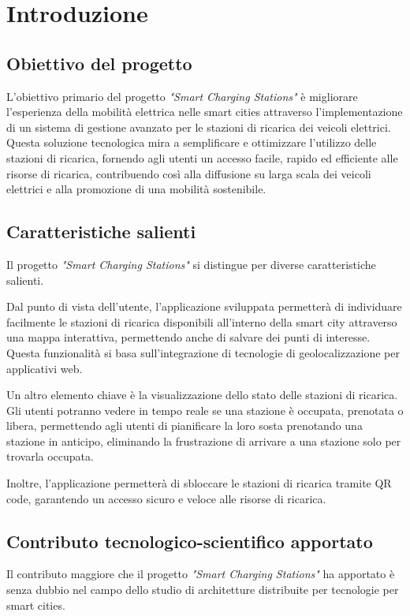 

\section{Introduzione}

\subsection{Obiettivo del progetto}
L'obiettivo primario del progetto \textit{"Smart Charging Stations"} è migliorare l'esperienza della
mobilità elettrica nelle smart cities attraverso l'implementazione di un sistema di gestione avanzato
per le stazioni di ricarica dei veicoli elettrici. Questa soluzione tecnologica mira a semplificare e
ottimizzare l'utilizzo delle stazioni di ricarica, fornendo agli utenti un accesso facile, rapido ed
efficiente alle risorse di ricarica, contribuendo così alla diffusione su larga scala dei veicoli elettrici
e alla promozione di una mobilità sostenibile.

\subsection{Caratteristiche salienti}
Il progetto \textit{"Smart Charging Stations"} si distingue per diverse caratteristiche salienti.

Dal punto di vista dell'utente, l'applicazione sviluppata permetterà di individuare facilmente le
stazioni di ricarica disponibili all'interno della smart city attraverso una mappa interattiva, permettendo anche di
salvare dei punti di interesse.
Questa funzionalità si basa sull'integrazione di tecnologie di geolocalizzazione per applicativi web.

Un altro elemento chiave è la visualizzazione dello stato delle stazioni di ricarica.
Gli utenti potranno vedere in tempo reale se una stazione è occupata, prenotata o libera, permettendo
agli utenti di pianificare la loro sosta prenotando una stazione in anticipo, eliminando la frustrazione di arrivare a una stazione
solo per trovarla occupata.

Inoltre, l'applicazione permetterà di sbloccare le stazioni di ricarica tramite QR code, garantendo un accesso sicuro e veloce alle risorse di ricarica.

\subsection{Contributo tecnologico-scientifico apportato}
Il contributo maggiore che il progetto \textit{"Smart Charging Stations"} ha apportato è senza dubbio nel campo dello studio di architetture distribuite per tecnologie per smart cities.

